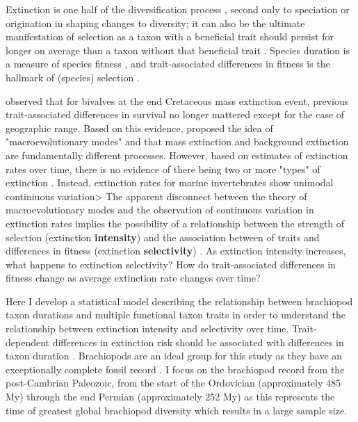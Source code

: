 \documentclass[11pt]{article}
\begin{document}
Extinction is one half of the diversification process \citep{Raup1994,Stanley1979,Stanley1975}, second only to speciation or origination in shaping changes to diversity; it can also be the ultimate manifestation of selection as a taxon with a beneficial trait should persist for longer on average than a taxon without that beneficial trait \citep{Jablonski2008a,Rabosky2010b,Raup1994,Stanley1975}. Species duration is a measure of species fitness \citep{Cooper1984}, and trait-associated differences in fitness is the hallmark of (species) selection \citep{Rabosky2010b}.

\citet{Jablonski1986} observed that for bivalves at the end Cretaceous mass extinction event, previous trait-associated differences in survival no longer mattered except for the case of geographic range. Based on this evidence, \citet{Jablonski1986} proposed the idea of "macroevolutionary modes" and that mass extinction and background extinction are fundamentally different processes. However, based on estimates of extinction rates over time, there is no evidence of there being two or more "types" of extinction \citep{Wang2003}. Instead, extinction rates for marine invertebrates show unimodal continiuous variation> The apparent disconnect between the theory of macroevolutionary modes and the observation of continuous variation in extinction rates implies the possibility of a relationship between the strength of selection (extinction \textbf{intensity}) and the association between of traits and differences in fitness (extinction \textbf{selectivity}) \citep{Payne2016}. As extinction intensity increases, what happens to extinction selectivity? How do trait-associated differences in fitness change as average extinction rate changes over time?

Here I develop a statistical model describing the relationship between brachiopod taxon durations and multiple functional taxon traits in order to understand the relationship between extinction intensity and selectivity over time. Trait-dependent differences in extinction risk should be associated with differences in taxon duration \citep{Cooper1984,Rabosky2010b}. Brachiopods are an ideal group for this study as they have an exceptionally complete fossil record \citep{Foote1996e,Foote2000a}. I focus on the brachiopod record from the post-Cambrian Paleozoic, from the start of the Ordovician (approximately 485 My) through the end Permian (approximately 252 My) as this represents the time of greatest global brachiopod diversity \citep{Alroy2010} which results in a large sample size.
\end{document}
